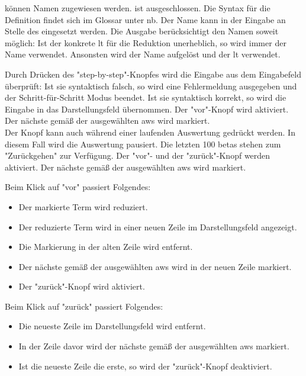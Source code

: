 \documentclass[parskip=full,11pt,twoside]{scrartcl}
\begin{document}
 können Namen zugewiesen werden.
 ist ausgeschlossen.
Die Syntax für die Definition findet sich im Glossar unter \gls{nb}.
Der Name kann in der Eingabe an Stelle des  eingesetzt werden.
Die Ausgabe berücksichtigt den Namen soweit möglich:
Ist der konkrete \gls{lt} für die Reduktion unerheblich, so wird immer der Name verwendet.
Ansonsten wird der Name aufgelöst und der \gls{lt} verwendet.

Durch Drücken des "step-by-step"-Knopfes wird die Eingabe aus dem Eingabefeld überprüft:
Ist sie syntaktisch falsch, so wird eine Fehlermeldung ausgegeben und der Schritt-für-Schritt Modus beendet.
Ist sie syntaktisch korrekt, so wird die Eingabe in das Darstellungsfeld übernommen. 
Der "vor"-Knopf wird aktiviert.
Der nächste  gemäß der ausgewählten \gls{aws} wird markiert.
\\
Der Knopf kann auch während einer laufenden Auswertung gedrückt werden.
In diesem Fall wird die Auswertung pausiert.
Die letzten 100 \glspl{beta} stehen zum "Zurückgehen" zur Verfügung.
Der "vor"- und der "zurück"-Knopf werden aktiviert.
Der nächste  gemäß der ausgewählten \gls{aws} wird markiert.

Beim Klick auf "vor" passiert Folgendes:
\begin{itemize}
\item Der markierte Term wird reduziert.
\item Der reduzierte Term wird in einer neuen Zeile im Darstellungsfeld angezeigt.
\item Die Markierung in der alten Zeile wird entfernt.
\item Der nächste  gemäß der ausgewählten \gls{aws} wird in der neuen Zeile markiert.
\item Der "zurück"-Knopf wird aktiviert.
\end{itemize}

Beim Klick auf "zurück" passiert Folgendes:
\begin{itemize}
\item Die neueste Zeile im Darstellungsfeld wird entfernt.
\item In der Zeile davor wird der nächste  gemäß der ausgewählten \gls{aws} markiert.
\item Ist die neueste Zeile die erste, so wird der "zurück"-Knopf deaktiviert.
\end{itemize}
\end{document}
